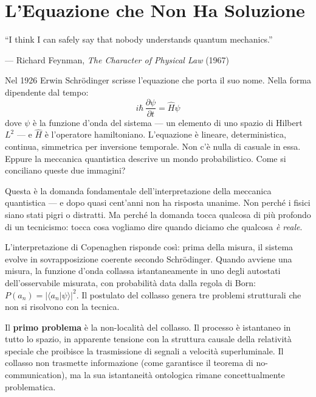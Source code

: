 \documentclass[12pt,a4paper,openany]{book}
\newcommand{\sezione}[1]{\vspace{1.2em}{\large\bfseries #1}\vspace{0.5em}\par}
\begin{document}
\chapter{L'Equazione che Non Ha Soluzione}

\epigraph{``I think I can safely say that nobody understands quantum mechanics.''}{--- Richard Feynman, \textit{The Character of Physical Law} (1967)}

\sezione{L'equazione di Schrödinger e il suo strano silenzio}

Nel 1926 Erwin Schrödinger scrisse l'equazione che porta il suo nome. Nella forma dipendente dal tempo:
\[
i\hbar\,\frac{\partial\psi}{\partial t} = \hat{H}\psi
\]
dove $\psi$ è la funzione d'onda del sistema — un elemento di uno spazio di Hilbert $L^2$ — e $\hat{H}$ è l'operatore hamiltoniano. L'equazione è lineare, deterministica, continua, simmetrica per inversione temporale. Non c'è nulla di casuale in essa. Eppure la meccanica quantistica descrive un mondo probabilistico. Come si conciliano queste due immagini?

Questa è la domanda fondamentale dell'interpretazione della meccanica quantistica — e dopo quasi cent'anni non ha risposta unanime. Non perché i fisici siano stati pigri o distratti. Ma perché la domanda tocca qualcosa di più profondo di un tecnicismo: tocca cosa vogliamo dire quando diciamo che qualcosa \textit{è reale}.

\sezione{Il postulato del collasso e i suoi tre problemi}

L'interpretazione di Copenaghen risponde così: prima della misura, il sistema evolve in sovrapposizione coerente secondo Schrödinger. Quando avviene una misura, la funzione d'onda collassa istantaneamente in uno degli autostati dell'osservabile misurata, con probabilità data dalla regola di Born: $P(a_n) = |\langle a_n|\psi\rangle|^2$. Il postulato del collasso genera tre problemi strutturali che non si risolvono con la tecnica.

Il \textbf{primo problema} è la non-località del collasso. Il processo è istantaneo in tutto lo spazio, in apparente tensione con la struttura causale della relatività speciale che proibisce la trasmissione di segnali a velocità superluminale. Il collasso non trasmette informazione (come garantisce il teorema di no-communication), ma la sua istantaneità ontologica rimane concettualmente problematica.
\end{document}
